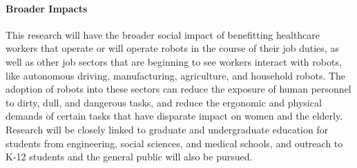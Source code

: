 
\vspace{0.5 em}

\paragraph*{\Large Broader Impacts}
This research will have the broader social impact of benefitting healthcare workers that operate or will operate robots in the course of their job duties, as well as other job sectors that are beginning to see workers interact with robots, like autonomous driving, manufacturing, agriculture, and household robots. The adoption of robots into these sectors can reduce the exposure of human personnel to dirty, dull, and dangerous tasks, and reduce the ergonomic and physical demands of certain tasks that have disparate impact on women and the elderly.  Research will be closely linked to graduate and undergraduate education for students from engineering, social sciences, and medical schools, and outreach to K-12 students and the general public will also be pursued. 

\pagebreak
